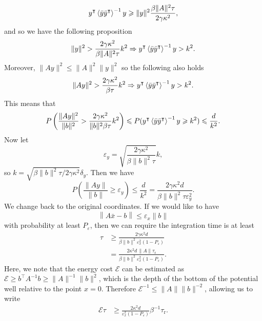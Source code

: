 \documentclass[prx,onecolumn,floatfix,longbibliography,notitlepage, nofootinbib]{revtex4-1}
\renewcommand{\geq}{\geqslant}
\renewcommand{\leq}{\leqslant}
\begin{document}
\begin{appendix}
\begin{equation}
y^\intercal \braket{\bar{y} \bar{y}^\intercal}^{-1} y \geq \|y\|^2\frac{\beta\|A\|^2\tau}{2 \gamma \kappa^2 },
\end{equation}
and so we have the following proposition
\begin{equation}
    \|y\|^2 > \frac{2 \gamma\kappa^2}{\beta\|A\|^2\tau}k^2 \Rightarrow
    y^\intercal \braket{\bar{y} \bar{y}^\intercal}^{-1}y > k^2.
\end{equation}
Moreover, $\|Ay\|^2 \leq \|A\|^2 \|y\|^2$ so the following also holds
\begin{equation}
    \|A y\|^2 > \frac{2 \gamma\kappa^2}{\beta\tau}k^2 \Rightarrow
    y^\intercal \braket{\bar{y} \bar{y}^\intercal}^{-1}y > k^2.
\end{equation}
This means that 
\begin{equation}
    P\left(  \frac{\|A y\|^2}{\|b\|^2} > \frac{2 \gamma\kappa^2}{\|b\|^2\beta\tau}k^2\right) \leq P( y^\intercal \braket{\bar{y} \bar{y}^\intercal}^{-1}y \geq k^2) \leq \frac{d}{k^2}.
\end{equation}
Now let
\begin{equation}
\varepsilon_y = \sqrt{\frac{2 \gamma \kappa^2}{\beta\|b\|^2\tau}} k,
\end{equation}
so $k = \sqrt{\beta \|b\|^2 \tau/2\gamma \kappa^2}\delta_y$. Then we have
\begin{equation}
    P\left(  \frac{\|A y\|}{\|b\|} \geq \varepsilon_y\right) \leq \frac{d}{k^2} = \frac{2 \gamma \kappa^2d}{\beta \|b\|^2 \tau \varepsilon_y^2}.
\end{equation}
We change back to the original coordinates. If we would like to have
\begin{equation}
    \left \|A \bar{x} - b \right\| \leq \varepsilon_x \|b\| 
\end{equation}
with probability at least $P_\varepsilon$, then we can require the integration time is at least
\begin{align}
    \tau &\geq \frac{2 \gamma\kappa^2 d  }{\beta \|b\|^2 \varepsilon_x^2 (1-P_\varepsilon)} \\
    &=\frac{2 \kappa^2 d\, \|A\| \tau_\text{r} }{\beta \|b\|^2 \varepsilon_x^2 (1-P_\varepsilon)} .
\end{align}
Here, we note that the energy cost $\mathcal{E}$ can be estimated as $\mathcal{E} \geq b^\intercal A^{-1} b \geq \|A\|^{-1}\|b\|^2$, which is the depth of the bottom of the potential well relative to the point $x=0$. Therefore $\mathcal{E}^{-1} \leq \|A\|\|b\|^{-2}$, allowing us to write
\begin{align}
    \mathcal{E}\tau &\geq \frac{2 \kappa^2 d  }{ \varepsilon_x^2 (1-P_\varepsilon)} \beta^{-1}\tau_\text{r}.
\end{align}


\end{appendix}
\end{document}
